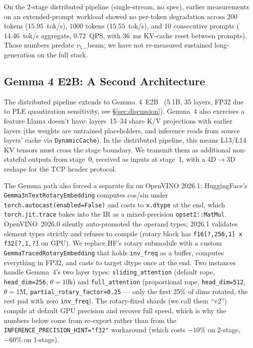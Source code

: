 \documentclass[11pt]{article}
\newcommand{\brk}{\discretionary{}{}{}}
\begin{document}
On the 2-stage distributed pipeline (single-stream, no spec), earlier measurements on an extended-prompt workload showed no per-token degradation across $200$ tokens ($15.95$~tok/s), $1000$ tokens ($15.55$~tok/s), and 10 consecutive prompts ($14.46$~tok/s aggregate, $0.72$~QPS, with $36$~ms KV-cache reset between prompts). Those numbers predate $v_5$\_beam; we have not re-measured sustained long-generation on the full stack.

\subsection{Gemma 4 E2B: A Second Architecture}
\label{sec:gemma}

The distributed pipeline extends to Gemma~4~E2B~\cite{gemma4_2026} (5.1B, 35 layers, FP32 due to PLE quantization sensitivity, see \S\ref{sec:discussion}). Gemma~4 also exercises a feature Llama doesn't have: layers~15--34 share K/V projections with earlier layers (the weights are untrained placeholders, and inference reads from source layers' cache via \texttt{DynamicCache}). In the distributed pipeline, this means L13/L14 KV tensors must cross the stage boundary. We transmit them as additional non-stateful outputs from stage~0, received as inputs at stage~1, with a 4D$\rightarrow$3D reshape for the TCP header protocol.

The Gemma path also forced a separate fix on OpenVINO 2026.1: HuggingFace's \texttt{Gemma3n\brk Text\brk Rotary\brk Embedding} computes cos/sin under \texttt{torch.autocast(enabled=False)} and casts to \texttt{x.dtype} at the end, which \texttt{torch.\brk jit.\brk trace} bakes into the IR as a mixed-precision \texttt{opset1::MatMul}. OpenVINO~2026.0 silently auto-promoted the operand types; 2026.1 validates element types strictly and refuses to compile (rotary block has \texttt{f16[?,256,1] x f32[?,1,?]} on GPU). We replace HF's rotary submodule with a custom \texttt{Gemma\brk Traced\brk Rotary\brk Embedding} that holds \texttt{inv\_freq} as a buffer, computes everything in FP32, and casts to target dtype once at the end. Two instances handle Gemma~4's two layer types: \texttt{sliding\_attention} (default rope, \texttt{head\_dim=256}, $\theta=10\text{k}$) and \texttt{full\_attention} (proportional rope, \texttt{head\_dim=512}, $\theta=1\text{M}$, \texttt{partial\_\brk rotary\_\brk factor=0.25} --- only the first 25\% of dims rotated, the rest pad with zero \texttt{inv\_freq}). The rotary-fixed shards (we call them ``v2'') compile at default GPU precision and recover full speed, which is why the numbers below come from re-export rather than from the \texttt{INFERENCE\_\brk PRECISION\_\brk HINT="f32"} workaround (which costs ${-}10\%$ on 2-stage, ${-}60\%$ on 1-stage).
\end{document}
